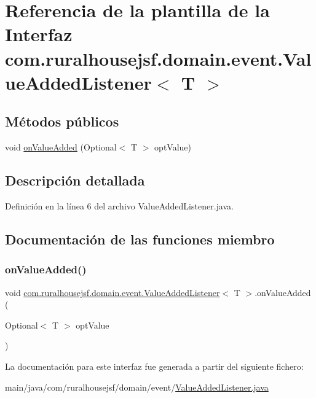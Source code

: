 \hypertarget{a00172}{}\section{Referencia de la plantilla de la Interfaz com.\+ruralhousejsf.\+domain.\+event.\+Value\+Added\+Listener$<$ T $>$}
\label{a00172}
\subsection*{Métodos públicos}
\begin{DoxyCompactItemize}
\item 
void \mbox{\hyperlink{a00172_a69af10ae4e2b293b64b2f337482e6ad8}{on\+Value\+Added}} (Optional$<$ T $>$ opt\+Value)
\end{DoxyCompactItemize}


\subsection{Descripción detallada}


Definición en la línea 6 del archivo Value\+Added\+Listener.\+java.



\subsection{Documentación de las funciones miembro}
\mbox{\label{a00172_a69af10ae4e2b293b64b2f337482e6ad8}} 
\subsubsection{\texorpdfstring{onValueAdded()}{onValueAdded()}}
{\footnotesize\ttfamily void \mbox{\hyperlink{a00172}{com.\+ruralhousejsf.\+domain.\+event.\+Value\+Added\+Listener}}$<$ T $>$.on\+Value\+Added (\begin{DoxyParamCaption}\item[{Optional$<$ T $>$}]{opt\+Value }\end{DoxyParamCaption})}



La documentación para este interfaz fue generada a partir del siguiente fichero\+:\begin{DoxyCompactItemize}
\item 
main/java/com/ruralhousejsf/domain/event/\mbox{\hyperlink{a00035}{Value\+Added\+Listener.\+java}}\end{DoxyCompactItemize}
